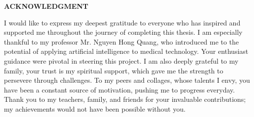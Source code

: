 \documentclass[../main.tex]{subfiles}
\begin{document}
\begin{center}
    \Large{\textbf{ACKNOWLEDGMENT}}\\
\end{center}
\vspace{1cm}
I would like to express my deepest gratitude to everyone who has inspired and supported me throughout the journey of completing this thesis.
I am especially thankful to my professor Mr. Nguyen Hong Quang, who introduced me to the potential of applying artificial intelligence to medical technology.
Your enthusiast guidance  were pivotal in steering this project.
I am also deeply grateful to my family, your trust is my spiritual support, which gave me the strength to persevere through challenges.
To my peers and collages, whose talents I envy, you have been a constant source of motivation, pushing me to progress everyday.
Thank you to my teachers, family, and friends for your invaluable contributions; my achievements would not have been possible without you.
\end{document}

